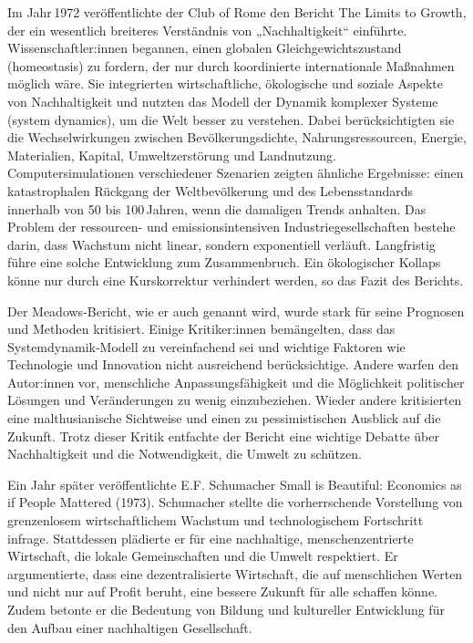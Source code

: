 \documentclass[
  letterpaper,
  DIV=11,
  numbers=noendperiod]{scrartcl}
\begin{document}
Im Jahr\,1972 veröffentlichte der Club of Rome den Bericht The Limits to
Growth, der ein wesentlich breiteres Verständnis von „Nachhaltigkeit``
einführte. Wissenschaftler:innen begannen, einen globalen
Gleichgewichtszustand (homeostasis) zu fordern, der nur durch
koordinierte internationale Maßnahmen möglich wäre. Sie integrierten
wirtschaftliche, ökologische und soziale Aspekte von Nachhaltigkeit und
nutzten das Modell der Dynamik komplexer Systeme (system dynamics), um
die Welt besser zu verstehen. Dabei berücksichtigten sie die
Wechselwirkungen zwischen Bevölkerungsdichte, Nahrungsressourcen,
Energie, Materialien, Kapital, Umweltzerstörung und Landnutzung.
Computersimulationen verschiedener Szenarien zeigten ähnliche
Ergebnisse: einen katastrophalen Rückgang der Weltbevölkerung und des
Lebensstandards innerhalb von 50 bis 100\,Jahren, wenn die damaligen
Trends anhalten. Das Problem der ressourcen- und emissionsintensiven
Industriegesellschaften bestehe darin, dass Wachstum nicht linear,
sondern exponentiell verläuft. Langfristig führe eine solche Entwicklung
zum Zusammenbruch. Ein ökologischer Kollaps könne nur durch eine
Kurskorrektur verhindert werden, so das Fazit des Berichts.

Der Meadows-Bericht, wie er auch genannt wird, wurde stark für seine
Prognosen und Methoden kritisiert. Einige Kritiker:innen bemängelten,
dass das Systemdynamik‑Modell zu vereinfachend sei und wichtige Faktoren
wie Technologie und Innovation nicht ausreichend berücksichtige. Andere
warfen den Autor:innen vor, menschliche Anpassungsfähigkeit und die
Möglichkeit politischer Lösungen und Veränderungen zu wenig
einzubeziehen. Wieder andere kritisierten eine malthusianische
Sichtweise und einen zu pessimistischen Ausblick auf die Zukunft. Trotz
dieser Kritik entfachte der Bericht eine wichtige Debatte über
Nachhaltigkeit und die Notwendigkeit, die Umwelt zu schützen.

Ein Jahr später veröffentlichte E.F. Schumacher Small is Beautiful:
Economics as if People Mattered (1973). Schumacher stellte die
vorherrschende Vorstellung von grenzenlosem wirtschaftlichem Wachstum
und technologischem Fortschritt infrage. Stattdessen plädierte er für
eine nachhaltige, menschenzentrierte Wirtschaft, die lokale
Gemeinschaften und die Umwelt respektiert. Er argumentierte, dass eine
dezentralisierte Wirtschaft, die auf menschlichen Werten und nicht nur
auf Profit beruht, eine bessere Zukunft für alle schaffen könne. Zudem
betonte er die Bedeutung von Bildung und kultureller Entwicklung für den
Aufbau einer nachhaltigen Gesellschaft.
\end{document}
